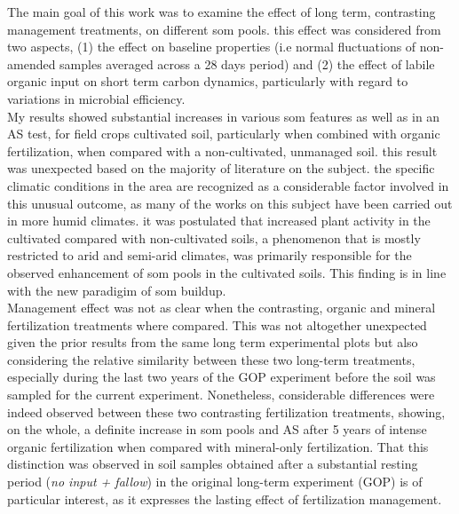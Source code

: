 

The  main goal of this work was to examine the effect of long term, contrasting management treatments, on different \gls{som} pools. this effect was considered from two aspects, (1) the effect on baseline properties (i.e normal fluctuations of non-amended samples averaged across a 28 days period) and (2) the effect of labile organic input on short term  carbon dynamics, particularly with regard to variations in microbial efficiency.\\
My results showed substantial increases in various \gls{som} features as well as in an AS test, for field crops cultivated soil, particularly when combined with organic fertilization, when compared with a non-cultivated, unmanaged soil. this result was unexpected based on the majority of literature on the subject. the specific climatic conditions in the area are recognized as a considerable factor involved in this unusual outcome, as many of the works on this subject have been carried out in more humid climates. it was postulated that increased plant activity in the cultivated compared with non-cultivated soils, a phenomenon that is mostly restricted to arid and semi-arid climates, was primarily responsible for the observed enhancement of \gls{som} pools in the cultivated soils. This finding is in line with the new paradigim of \gls{som} buildup. \\
Management effect was not as clear when the contrasting, organic and mineral fertilization treatments where compared. This was not altogether unexpected given the prior results from the same long term experimental plots but also considering the relative similarity between these two long-term treatments, especially during the last two years of the GOP experiment before the soil was sampled for the current experiment. Nonetheless, considerable differences were indeed observed between these two contrasting fertilization treatments, showing, on the whole, a definite increase in \gls{som} pools and AS after 5 years of intense organic fertilization when compared with mineral-only fertilization. That this distinction was observed in soil samples obtained after a substantial resting period (\textit{no input + fallow}) in the original long-term experiment (GOP) is of particular interest, as it expresses the lasting effect of fertilization management.\\
